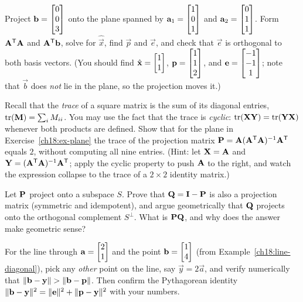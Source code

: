 \begin{exercise}\label{ch18:ex-plane}
Project $\mathbf{b}=\begin{bmatrix}0\\0\\3\end{bmatrix}$ onto the plane spanned by $\mathbf{a}_1=\begin{bmatrix}1\\0\\1\end{bmatrix}$ and
$\mathbf{a}_2=\begin{bmatrix}0\\1\\1\end{bmatrix}$. Form $\mathbf{A}^{\mathsf{T}}\mathbf{A}$ and $\mathbf{A}^{\mathsf{T}}\mathbf{b}$, solve for
$\hat{\vec{x}}$, find $\vec{p}$ and $\vec{e}$, and check that $\vec{e}$ is orthogonal to both basis
vectors. (You should find $\hat{\mathbf{x}}=\begin{bmatrix}1\\1\end{bmatrix}$, $\mathbf{p}=\begin{bmatrix}1\\1\\2\end{bmatrix}$, and
$\mathbf{e}=\begin{bmatrix}-1\\-1\\1\end{bmatrix}$; note that $\vec{b}$ does \emph{not} lie in the plane, so the projection
moves it.)
\end{exercise}

\begin{exercise}\label{ch18:ex-trace}
Recall that the \emph{trace} of a square matrix is the sum of its diagonal entries, $\operatorname{tr}(\mathbf{M}) = \sum_i M_{ii}$.
You may use the fact that the trace is \emph{cyclic}: $\operatorname{tr}(\mathbf{X}\mathbf{Y})=\operatorname{tr}(\mathbf{Y}\mathbf{X})$ whenever both products are defined.
Show that for the plane in Exercise~\ref{ch18:ex-plane} the trace of the projection matrix
$\mathbf{P}=\mathbf{A}(\mathbf{A}^{\mathsf{T}}\mathbf{A})^{-1}\mathbf{A}^{\mathsf{T}}$ equals $2$, without computing all nine entries.
(Hint: let $\mathbf{X}=\mathbf{A}$ and $\mathbf{Y}=(\mathbf{A}^{\mathsf{T}}\mathbf{A})^{-1}\mathbf{A}^{\mathsf{T}}$; apply the cyclic property to push
$\mathbf{A}$ to the right, and watch the expression collapse to the trace of a $2\times 2$ identity matrix.)
\end{exercise}

\begin{exercise}\label{ch18:ex-complement}
Let $\mathbf{P}$ project onto a subspace $S$. Prove that $\mathbf{Q}=\mathbf{I}-\mathbf{P}$ is also a projection
matrix (symmetric and idempotent), and argue geometrically that $\mathbf{Q}$ projects onto the
orthogonal complement $S^\perp$. What is $\mathbf{P}\mathbf{Q}$, and why does the answer make geometric
sense?
\end{exercise}

\begin{exercise}\label{ch18:ex-closest-num}
For the line through $\mathbf{a}=\begin{bmatrix}2\\1\end{bmatrix}$ and the point $\mathbf{b}=\begin{bmatrix}1\\4\end{bmatrix}$ (from
Example~\ref{ch18:line-diagonal}), pick any \emph{other} point on the line, say $\vec{y}=2\vec{a}$,
and verify numerically that $\lVert\mathbf{b}-\mathbf{y}\rVert > \lVert\mathbf{b}-\mathbf{p}\rVert$. Then confirm the
Pythagorean identity $\lVert\mathbf{b}-\mathbf{y}\rVert^2 = \lVert\mathbf{e}\rVert^2 + \lVert\mathbf{p}-\mathbf{y}\rVert^2$ with
your numbers.
\end{exercise}

